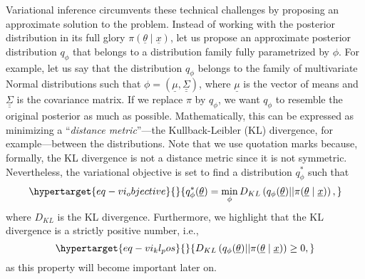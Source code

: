 \documentclass[
]{scrartcl}
\begin{document}
\begin{refsegment}
Variational inference circumvents these technical challenges by
proposing an approximate solution to the problem. Instead of working
with the posterior distribution in its full glory
\(\pi(\underline{\theta} \mid \underline{x})\), let us propose an
approximate posterior distribution \(q_\phi\) that belongs to a
distribution family fully parametrized by \(\phi\). For example, let us
say that the distribution \(q_\phi\) belongs to the family of
multivariate Normal distributions such that
\(\phi = (\underline{\mu}, \underline{\underline{\Sigma}})\), where
\(\underline{\mu}\) is the vector of means and
\(\underline{\underline{\Sigma}}\) is the covariance matrix. If we
replace \(\pi\) by \(q_\phi\), we want \(q_\phi\) to resemble the
original posterior as much as possible. Mathematically, this can be
expressed as minimizing a ``\emph{distance metric}''---the
Kullback-Leibler (KL) divergence, for example---between the
distributions. Note that we use quotation marks because, formally, the
KL divergence is not a distance metric since it is not symmetric.
Nevertheless, the variational objective is set to find a distribution
\(q_\phi^*\) such that
\begin{equation}\protect\hypertarget{eq-vi_objective}{}{
q_\phi^*(\underline{\theta}) =
\min_\phi D_{KL}\left(
    q_\phi(\underline{\theta}) \vert\vert 
    \pi(\underline{\theta} \mid \underline{x})
\right),
}\label{eq-vi_objective}\end{equation} where \(D_{KL}\) is the KL
divergence. Furthermore, we highlight that the KL divergence is a
strictly positive number, i.e.,
\begin{equation}\protect\hypertarget{eq-vi_kl_pos}{}{
D_{KL}\left(
    q_\phi(\underline{\theta}) \vert\vert 
    \pi(\underline{\theta} \mid \underline{x})
\right) \geq 0,
}\label{eq-vi_kl_pos}\end{equation} as this property will become
important later on.


\end{refsegment}
\end{document}
